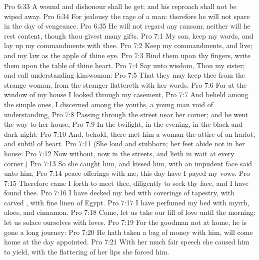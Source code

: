 \vs Pro 6:33 A wound and dishonour shall he get; and his reproach shall not be wiped away.
\vs Pro 6:34 For jealousy  the rage of a man: therefore he will not spare in the day of vengeance.
\vs Pro 6:35 He will not regard any ransom; neither will he rest content, though thou givest many gifts.
\vs Pro 7:1 My son, keep my words, and lay up my commandments with thee.
\vs Pro 7:2 Keep my commandments, and live; and my law as the apple of thine eye.
\vs Pro 7:3 Bind them upon thy fingers, write them upon the table of thine heart.
\vs Pro 7:4 Say unto wisdom, Thou  my sister; and call understanding  kinswoman:
\vs Pro 7:5 That they may keep thee from the strange woman, from the stranger  flattereth with her words.
\vs Pro 7:6 For at the window of my house I looked through my casement,
\vs Pro 7:7 And beheld among the simple ones, I discerned among the youths, a young man void of understanding,
\vs Pro 7:8 Passing through the street near her corner; and he went the way to her house,
\vs Pro 7:9 In the twilight, in the evening, in the black and dark night:
\vs Pro 7:10 And, behold, there met him a woman  the attire of an harlot, and subtil of heart.
\vs Pro 7:11 (She  loud and stubborn; her feet abide not in her house:
\vs Pro 7:12 Now  without, now in the streets, and lieth in wait at every corner.)
\vs Pro 7:13 So she caught him, and kissed him,  with an impudent face said unto him,
\vs Pro 7:14  peace offerings with me; this day have I payed my vows.
\vs Pro 7:15 Therefore came I forth to meet thee, diligently to seek thy face, and I have found thee.
\vs Pro 7:16 I have decked my bed with coverings of tapestry, with carved , with fine linen of Egypt.
\vs Pro 7:17 I have perfumed my bed with myrrh, aloes, and cinnamon.
\vs Pro 7:18 Come, let us take our fill of love until the morning: let us solace ourselves with loves.
\vs Pro 7:19 For the goodman  not at home, he is gone a long journey:
\vs Pro 7:20 He hath taken a bag of money with him,  will come home at the day appointed.
\vs Pro 7:21 With her much fair speech she caused him to yield, with the flattering of her lips she forced him.
